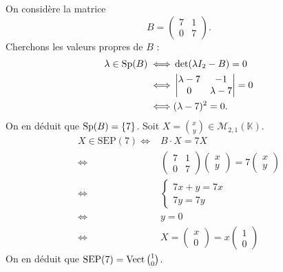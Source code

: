 \begin{exo}
	On considère la matrice \[
		B = \begin{pmatrix}
			7&1\\
			0&7
		\end{pmatrix}
	.\]
	Cherchons les valeurs propres de $B$\/ :
	\begin{align*}
		\lambda \in \operatorname{Sp}(B) \iff& \operatorname{det}(\lambda I_2 - B) = 0\\
		\iff&
		\begin{vmatrix}
			\lambda - 7 & -1\\
			0&\lambda-7
		\end{vmatrix} = 0\\
		\iff& (\lambda - 7)^2 = 0.
	\end{align*}
	On en déduit que $\operatorname{Sp}(B) = \{7\}$.
	Soit $X = {x\choose y} \in \mathscr{M}_{2,1}(\mathds{K})$.
	\begin{align*}
		X \in \mathrm{SEP}(7) \iff& B\cdot X = 7X\\
		\iff& \begin{pmatrix}
			7&1\\
			0&7
		\end{pmatrix} \begin{pmatrix}
			x\\y
		\end{pmatrix} = 7 \begin{pmatrix}
			x\\y
		\end{pmatrix}\\
		\iff& \begin{cases}
			7x + y = 7x\\
			7y = 7y
		\end{cases}\\
		\iff& y = 0\\
		\iff& X = \begin{pmatrix}
			x\\ 0
		\end{pmatrix} = x \begin{pmatrix}
			1\\0
		\end{pmatrix}
	\end{align*}
	On en déduit que $\mathrm{SEP}(7) = \operatorname{Vect}{1\choose 0}$.


\end{exo}
